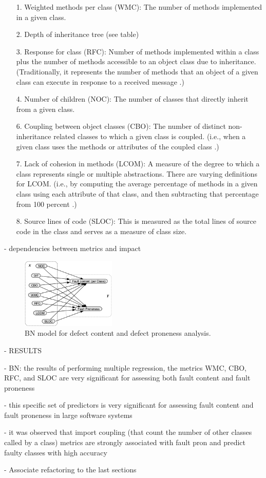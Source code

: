 \begin{itemize}
	\item[1.] Weighted methods per class (WMC): The number of methods implemented in a given class.
	\item[2.] Depth of inheritance tree (see table)
	\item[3.] Response for class (RFC): Number of methods implemented within a class plus the number of methods accessible to an object class due to inheritance. (Traditionally, it represents the number of methods that an object of a given class can execute in response to a received message \cite{b9pai2007empirical}.)
	\item[4.] Number of children (NOC): The number of classes that directly inherit from a given class.
	\item[6.] Coupling between object classes (CBO): The number of distinct non-inheritance related classes to which a given class is coupled. (i.e., when a given class uses the methods or attributes of the coupled class \cite{b9pai2007empirical}.)
	\item[7.] Lack of cohesion in methods (LCOM): A measure of the degree to which a class represents single or multiple abstractions. There are varying definitions for LCOM. (i.e., by computing the average percentage of methods in a given class using each attribute of that class, and then subtracting that percentage from 100 percent \cite{b9pai2007empirical}.)
	\item[8.] Source lines of code (SLOC): This is measured as the total lines of source code in the class and serves as a measure of class size.
\end{itemize}

- dependencies between metrics and impact

\begin{figure}[htbp]
	\centerline{\includegraphics[width=0.4\textwidth]{pictures/bn2.png}}
	\caption{BN model for defect content and defect proneness analysis.}
	\label{fig2bn}
\end{figure}

- RESULTS 

- BN: the results of performing multiple regression, the metrics WMC, CBO, RFC, and SLOC are very significant for assessing both fault content and fault proneness

- this specific set of predictors is very significant for assessing fault content and fault proneness in large software systems

- it was observed that import coupling (that count the number of other classes called by a class) metrics are strongly associated with fault
pron and predict faulty classes with high accuracy

- Associate refactoring to the last sections
